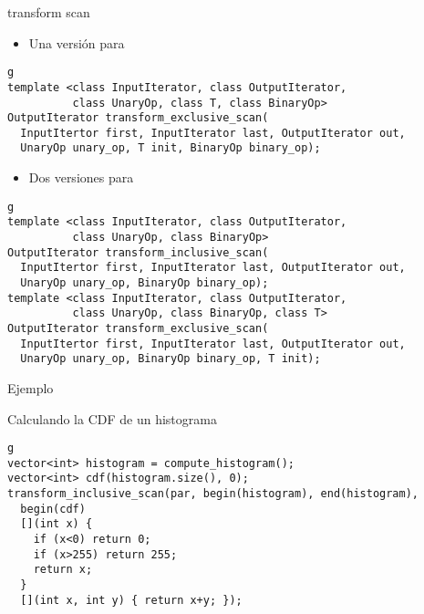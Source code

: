 \begin{frame}[t,fragile]{transform scan}
\begin{itemize}
  \item Una versión para 
\end{itemize}
\begin{lstlisting}g
template <class InputIterator, class OutputIterator, 
          class UnaryOp, class T, class BinaryOp>
OutputIterator transform_exclusive_scan(
  InputItertor first, InputIterator last, OutputIterator out, 
  UnaryOp unary_op, T init, BinaryOp binary_op);
\end{lstlisting}
\begin{itemize}
  \item Dos versiones para 
\end{itemize}
\begin{lstlisting}g
template <class InputIterator, class OutputIterator, 
          class UnaryOp, class BinaryOp>
OutputIterator transform_inclusive_scan(
  InputItertor first, InputIterator last, OutputIterator out, 
  UnaryOp unary_op, BinaryOp binary_op);
template <class InputIterator, class OutputIterator, 
          class UnaryOp, class BinaryOp, class T>
OutputIterator transform_exclusive_scan(
  InputItertor first, InputIterator last, OutputIterator out, 
  UnaryOp unary_op, BinaryOp binary_op, T init);
\end{lstlisting}
\end{frame}

\begin{frame}[t,fragile]{Ejemplo}
\begin{block}{Calculando la CDF de un histograma}
\begin{lstlisting}g
vector<int> histogram = compute_histogram();
vector<int> cdf(histogram.size(), 0);
transform_inclusive_scan(par, begin(histogram), end(histogram),
  begin(cdf)
  [](int x) {
    if (x<0) return 0;
    if (x>255) return 255;
    return x;
  }
  [](int x, int y) { return x+y; });
\end{lstlisting}
\end{block}
\end{frame}
